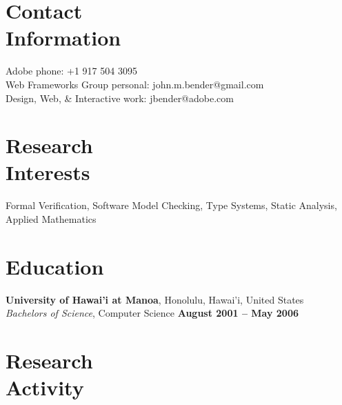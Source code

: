 \documentclass[margin,line]{resume}
\begin{document}
\begin{resume}

  \section{\mysidestyle Contact\\Information}

  Adobe                        \hfill phone: +1 917 504 3095\\
  Web Frameworks Group         \hfill personal: john.m.bender@gmail.com\\
  Design, Web, \& Interactive  \hfill work: jbender@adobe.com\\

  \section{\mysidestyle Research\\Interests}

  Formal Verification, Software Model Checking, Type Systems, Static Analysis, Applied Mathematics

  \section{\mysidestyle Education}

  \textbf{University of Hawai'i at Manoa}, Honolulu, Hawai'i, United States \vspace{2mm}\\\vspace{1mm}%
  \textsl{Bachelors of Science}, Computer Science \hfill \textbf{ August 2001 -- May 2006}\vspace{-3mm}\\\vspace{-1mm}%

  \section{\mysidestyle Research\\Activity}


\end{resume}
\end{document}
